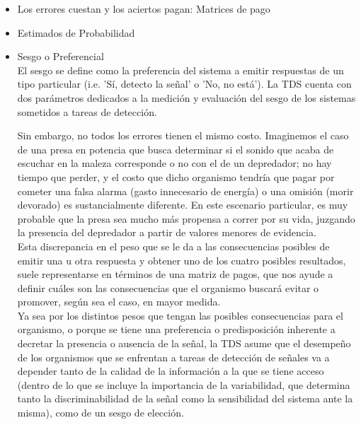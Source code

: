 \begin{itemize}
    \begin{itemize}
      \item{Los errores cuestan y los aciertos pagan: Matrices de pago}\\

      \item{Estimados de Probabilidad}

      \item{Sesgo o Preferencial}\\

  El sesgo se define como la preferencia del sistema a emitir respuestas de un tipo particular (i.e. 'Sí, detecto la señal' o 'No, no está'). La TDS cuenta con dos parámetros dedicados a la medición y evaluación del sesgo de los sistemas sometidos a tareas de detección.

 Sin embargo, no todos los errores tienen el mismo costo. Imaginemos el caso de una presa en potencia que busca determinar si el sonido que acaba de escuchar en la maleza corresponde o no con el de un depredador; no hay tiempo que perder, y el costo que dicho organismo tendría que pagar por cometer una falsa alarma (gasto innecesario de energía) o una omisión (morir devorado) es sustancialmente diferente. En este escenario particular, es muy probable que la presa sea mucho más propensa a correr por su vida, juzgando la presencia del depredador a partir de valores menores de evidencia.\\

Esta discrepancia en el peso que se le da a las consecuencias posibles de emitir una u otra respuesta y obtener uno de los cuatro posibles resultados, suele representarse en términos de una matriz de pagos, que nos ayude a definir cuáles son las consecuencias que el organismo buscará evitar o promover, según sea el caso, en mayor medida.\\

Ya sea por los distintos pesos que tengan las posibles consecuencias para el organismo, o porque se tiene una preferencia o predisposición inherente a decretar la presencia o ausencia de la señal, la TDS asume que el desempeño de los organismos que se enfrentan a tareas de detección de señales va a depender tanto de la calidad de la información a la que se tiene acceso (dentro de lo que se incluye la importancia de la variabilidad, que determina tanto la discriminabilidad de la señal como la sensibilidad del sistema ante la misma), como de un sesgo de elección.\\


\end{itemize}
\end{itemize}
